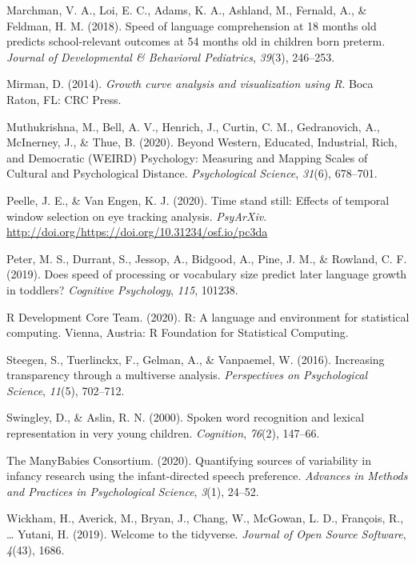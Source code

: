 \documentclass[10pt, letterpaper]{article}
\begin{document}
\leavevmode\hypertarget{ref-Marchman2018}{}%
Marchman, V. A., Loi, E. C., Adams, K. A., Ashland, M., Fernald, A., \&
Feldman, H. M. (2018). Speed of language comprehension at 18 months old
predicts school-relevant outcomes at 54 months old in children born
preterm. \emph{Journal of Developmental \& Behavioral Pediatrics},
\emph{39}(3), 246--253.

\leavevmode\hypertarget{ref-Mirman2014}{}%
Mirman, D. (2014). \emph{Growth curve analysis and visualization using
R}. Boca Raton, FL: CRC Press.

\leavevmode\hypertarget{ref-Muthukrishna2020}{}%
Muthukrishna, M., Bell, A. V., Henrich, J., Curtin, C. M., Gedranovich,
A., McInerney, J., \& Thue, B. (2020). Beyond Western, Educated,
Industrial, Rich, and Democratic (WEIRD) Psychology: Measuring and
Mapping Scales of Cultural and Psychological Distance.
\emph{Psychological Science}, \emph{31}(6), 678--701.

\leavevmode\hypertarget{ref-Peelle2020}{}%
Peelle, J. E., \& Van Engen, K. J. (2020). Time stand still: Effects of
temporal window selection on eye tracking analysis. \emph{PsyArXiv}.
\url{http://doi.org/https://doi.org/10.31234/osf.io/pc3da}

\leavevmode\hypertarget{ref-peter2019}{}%
Peter, M. S., Durrant, S., Jessop, A., Bidgood, A., Pine, J. M., \&
Rowland, C. F. (2019). Does speed of processing or vocabulary size
predict later language growth in toddlers? \emph{Cognitive Psychology},
\emph{115}, 101238.

\leavevmode\hypertarget{ref-RDevelopmentCoreTeam2010}{}%
R Development Core Team. (2020). R: A language and environment for
statistical computing. Vienna, Austria: R Foundation for Statistical
Computing.

\leavevmode\hypertarget{ref-steegenEtAl2016}{}%
Steegen, S., Tuerlinckx, F., Gelman, A., \& Vanpaemel, W. (2016).
Increasing transparency through a multiverse analysis.
\emph{Perspectives on Psychological Science}, \emph{11}(5), 702--712.

\leavevmode\hypertarget{ref-Swingley2000}{}%
Swingley, D., \& Aslin, R. N. (2000). Spoken word recognition and
lexical representation in very young children. \emph{Cognition},
\emph{76}(2), 147--66.

\leavevmode\hypertarget{ref-TheManyBabiesConsortium2020}{}%
The ManyBabies Consortium. (2020). Quantifying sources of variability in
infancy research using the infant-directed speech preference.
\emph{Advances in Methods and Practices in Psychological Science},
\emph{3}(1), 24--52.

\leavevmode\hypertarget{ref-Wickham2019}{}%
Wickham, H., Averick, M., Bryan, J., Chang, W., McGowan, L. D.,
François, R., \ldots{} Yutani, H. (2019). Welcome to the tidyverse.
\emph{Journal of Open Source Software}, \emph{4}(43), 1686.


\end{document}

